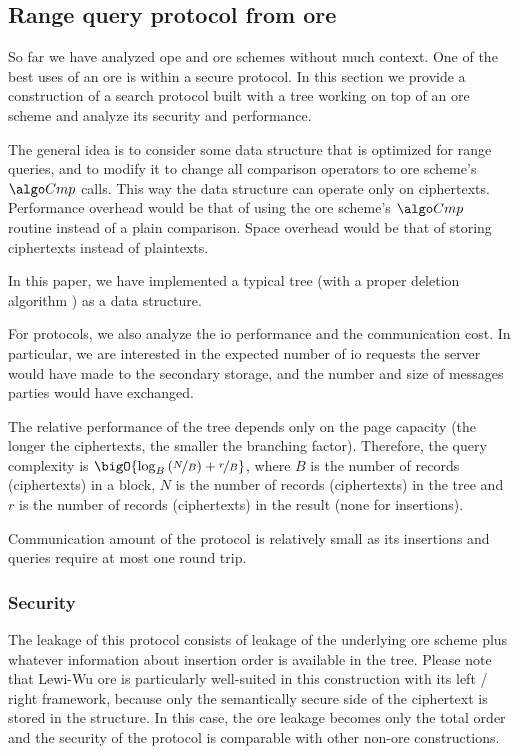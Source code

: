 \subsection{Range query protocol from \texorpdfstring{\acrshort{ore}}{ORE}}\label{section:range-snapshot:ore-to-protocol}

	So far we have analyzed \acrshort{ope} and \acrshort{ore} schemes without much context.
	One of the best uses of an \acrshort{ore} is within a secure protocol.
	In this section we provide a construction of a search protocol built with a {\BPlus} tree working on top of an \acrshort{ore} scheme and analyze its security and performance.

	The general idea is to consider some data structure that is optimized for range queries, and to modify it to change all comparison operators to \acrshort{ore} scheme's $\compare$ calls.
	This way the data structure can operate only on ciphertexts.
	Performance overhead would be that of using the \acrshort{ore} scheme's $\compare$ routine instead of a plain comparison.
	Space overhead would be that of storing ciphertexts instead of plaintexts.

	In this paper, we have implemented a typical {\BPlus} tree \cite{b-tree} (with a proper deletion algorithm \cite{b-plus-tree-deletion}) as a data structure.

	For protocols, we also analyze the \acrshort{io} performance and the communication cost.
	In particular, we are interested in the expected number of \acrshort{io} requests the server would have made to the secondary storage, and the number and size of messages parties would have exchanged.

	The relative performance of the {\BPlus} tree depends only on the page capacity (the longer the ciphertexts, the smaller the branching factor). 	Therefore, the query complexity is $\bigO{\log_B \left( \nicefrac{N}{B} \right) + \nicefrac{r}{B}}$, where $B$ is the number of records (ciphertexts) in a block, $N$ is the number of records (ciphertexts) in the tree and $r$ is the number of records (ciphertexts) in the result (none for insertions).

	Communication amount of the protocol is relatively small as its insertions and queries require at most one round trip.

	\subsubsection{Security}
		The leakage of this protocol consists of leakage of the underlying \acrshort{ore} scheme plus whatever information about insertion order is available in the {\BPlus} tree.
		Please note that Lewi-Wu \cite{lewi-wu-ore} \acrshort{ore} is particularly well-suited in this construction with its left / right framework, because only the semantically secure side of the ciphertext is stored in the structure.
		In this case, the \acrshort{ore} leakage becomes only the total order and the security of the protocol is comparable with other non-\acrshort{ore} constructions.
